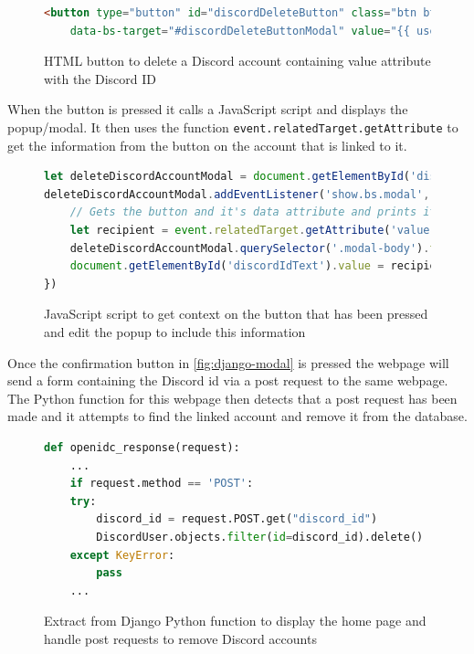 \begin{figure}[H]
\begin{lstlisting}[language=HTML]
<button type="button" id="discordDeleteButton" class="btn btn-danger btn-sm" data-bs-toggle="modal"
	data-bs-target="#discordDeleteButtonModal" value="{{ user.id }}" style="margin-top: 5px;">
\end{lstlisting}
\caption{HTML button to delete a Discord account containing value attribute with the Discord ID}
\label{fig:django-dis-delete-button}
\end{figure}

When the button is pressed it calls a JavaScript script and displays the popup/modal. It then uses the function \verb|event.relatedTarget.getAttribute| to get the information from the button on the account that is linked to it.

\begin{figure}[H]
\begin{lstlisting}[language=JavaScript]
let deleteDiscordAccountModal = document.getElementById('discordDeleteButtonModal')
deleteDiscordAccountModal.addEventListener('show.bs.modal', function (event) {
	// Gets the button and it's data attribute and prints it out in the .modal-body
	let recipient = event.relatedTarget.getAttribute('value')
	deleteDiscordAccountModal.querySelector('.modal-body').textContent = 'Are you sure you want to delete the link to the Discord account \'' + recipient + '\'?'
	document.getElementById('discordIdText').value = recipient
})
\end{lstlisting}
\caption{JavaScript script to get context on the button that has been pressed and edit the popup to include this information}
\label{fig:django-js-modal}
\end{figure}

Once the confirmation button in \ref{fig:django-modal} is pressed the webpage will send a form containing the Discord id via a post request to the same webpage. The Python function for this webpage then detects that a post request has been made and it attempts to find the linked account and remove it from the database.

\begin{figure}[H]
\begin{lstlisting}[language=python]
def openidc_response(request):
	...
	if request.method == 'POST':
	try:
		discord_id = request.POST.get("discord_id")
		DiscordUser.objects.filter(id=discord_id).delete()
	except KeyError:
		pass
	...
\end{lstlisting}
\caption{Extract from Django Python function to display the home page and handle post requests to remove Discord accounts}
\label{fig:django-view-post}
\end{figure}

